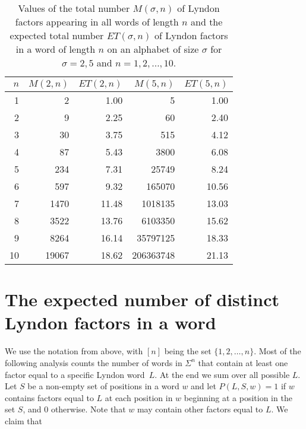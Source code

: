 \documentclass[11pt]{amsart}
\newcommand{\1}{\bar{1}}
\theoremstyle{plain}
\theoremstyle{definition}
\theoremstyle{remark}
\begin{document}
 
  \begin{table}[htb!]
 \centering
 \begin{tabular}{rrr|rr}
 \hline

 $n$ & $M(2,n)$  & $ET(2,n)$ & $M(5,n)$ & $ET(5,n)$ \\
 \hline
1 & 2 & 1.00 & 5 & 1.00\\
2& 9& 2.25 & 60 & 2.40\\
3& 30& 3.75 &  515 & 4.12\\
4& 87& 5.43 & 3800 & 6.08\\
5& 234& 7.31 & 25749 & 8.24\\
6& 597& 9.32 & 165070 & 10.56\\
7& 1470& 11.48 & 1018135 & 13.03\\
8& 3522& 13.76 & 6103350 & 15.62\\
9& 8264& 16.14 & 35797125  & 18.33\\
10& 19067& 18.62  & 206363748 & 21.13\\
\end{tabular}


\caption{\label{table2} {\small Values of the total number $M(\sigma,n)$ of Lyndon factors appearing in all words of length $n$ and the expected total number $ET(\sigma,n)$ of Lyndon factors in a word of length $n$ on an alphabet of size $\sigma$ for $\sigma=2,5$ and $n=1,2,\ldots,10$.}}
  \end{table}



\section{The expected number of distinct Lyndon factors in a word}
\label{sect-4}

We use the notation from above, with $[n]$ being the set $\{1,2,\dots,n\}$.  Most of the following analysis counts the number of words in $\Sigma^n$ that contain at least one factor equal to a specific Lyndon word~$L$.  At the end we sum over all possible $L$.  Let $S$ be a non-empty set of positions in a word $w$ and let $P(L,S,w)=1$ if $w$ contains factors equal to $L$ at each position in $w$ beginning at a position in the set $S$, and 0 otherwise.  Note that $w$ may contain other factors equal to $L$.  We claim that
\end{document}
